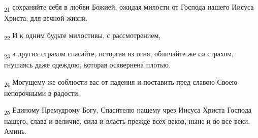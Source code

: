 \begin{tcolorbox}
\textsubscript{21} сохраняйте себя в любви Божией, ожидая милости от Господа нашего Иисуса Христа, для вечной жизни.
\end{tcolorbox}
\begin{tcolorbox}
\textsubscript{22} И к одним будьте милостивы, с рассмотрением,
\end{tcolorbox}
\begin{tcolorbox}
\textsubscript{23} а других страхом спасайте, исторгая из огня, обличайте же со страхом, гнушаясь даже одеждою, которая осквернена плотью.
\end{tcolorbox}
\begin{tcolorbox}
\textsubscript{24} Могущему же соблюсти вас от падения и поставить пред славою Своею непорочными в радости,
\end{tcolorbox}
\begin{tcolorbox}
\textsubscript{25} Единому Премудрому Богу, Спасителю нашему чрез Иисуса Христа Господа нашего, слава и величие, сила и власть прежде всех веков, ныне и во все веки. Аминь.
\end{tcolorbox}
